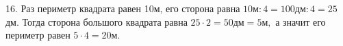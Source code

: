 16. Раз периметр квадрата равен 10м, его сторона равна $10\text{м}:4=100\text{дм}:4=25$дм. Тогда сторона большого квадрата равна $25\cdot2=50\text{дм}=5\text{м},$ а значит его периметр равен $5\cdot4=20$м.\\
